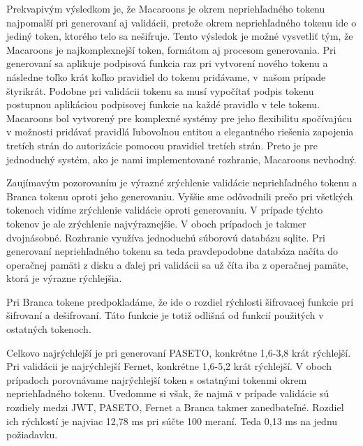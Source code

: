 Prekvapivým výsledkom je, že Macaroons je okrem nepriehľadného tokenu najpomalší pri generovaní aj validácii, pretože okrem nepriehľadného tokenu ide o jediný token, ktorého telo sa nešifruje. Tento výsledok je možné vysvetliť tým, že Macaroons je najkomplexnejší token, formátom aj procesom generovania. Pri generovaní sa aplikuje podpisová funkcia raz pri vytvorení nového tokenu a následne toľko krát koľko pravidiel do tokenu pridávame, v~našom prípade štyrikrát. Podobne pri validácii tokenu sa musí vypočítať podpis tokenu postupnou aplikáciou podpisovej funkcie na každé pravidlo v tele tokenu. Macaroons bol vytvorený pre komplexné systémy pre jeho flexibilitu spočívajúcu v možnosti pridávať pravidlá ľubovoľnou entitou a elegantného riešenia zapojenia tretích strán do autorizácie pomocou pravidiel tretích strán. Preto je pre jednoduchý systém, ako je nami implementované rozhranie, Macaroons nevhodný.

Zaujímavým pozorovaním je výrazné zrýchlenie validácie nepriehľadného tokenu a Branca tokenu oproti jeho generovaniu. Vyššie sme odôvodnili prečo pri všetkých tokenoch vidíme zrýchlenie validácie oproti generovaniu. V prípade týchto tokenov je ale zrýchlenie najvýraznejšie. V oboch prípadoch je takmer dvojnásobné. Rozhranie využíva jednoduchú súborovú databázu sqlite. Pri generovaní nepriehľadného tokenu sa teda pravdepodobne databáza načíta do operačnej pamäti z disku a ďalej pri validácii sa už číta iba z operačnej pamäte, ktorá je výrazne rýchlejšia.

Pri Branca tokene predpokladáme, že ide o rozdiel rýchlosti šifrovacej funkcie pri šifrovaní a dešifrovaní. Táto funkcie je totiž odlišná od funkcií použitých v ostatných tokenoch.

Celkovo najrýchlejší je pri generovaní PASETO, konkrétne 1,6-3,8 krát rýchlejší. Pri validácii je najrýchlejší Fernet, konkrétne 1,6-5,2 krát rýchlejší. V oboch prípadoch porovnávame najrýchlejší token s ostatnými tokenmi okrem nepriehľadného tokenu. Uvedomme si však, že najmä v prípade validácie sú rozdiely medzi JWT, PASETO, Fernet a Branca takmer zanedbateľné. Rozdiel ich rýchlostí je najviac 12,78 ms pri súčte 100 meraní. Teda 0,13 ms na jednu požiadavku.